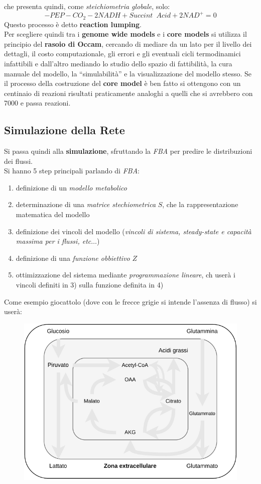 \documentclass[a4paper,12pt, oneside]{book}
\begin{document}
che presenta quindi, come \textit{steichiometria globale}, solo:
\[-PEP-CO_2-2NADH+Succint\,\,\,Acid+2NAD^{+}=0\]
Questo processo è detto \textbf{reaction lumping}.\\
Per scegliere quindi tra i \textbf{genome wide models} e i \textbf{core models}
si utilizza il principio del \textbf{rasoio di Occam}, cercando di mediare da un
lato per il livello dei dettagli, il costo computazionale, gli errori e gli
eventuali cicli termodinamici infattibili e dall'altro mediando lo studio dello
spazio di fattibilità, la cura manuale del modello, la ``simulabilità'' e la
visualizzazione del modello stesso. Se il processo della costruzione del
\textbf{core model} è ben fatto si ottengono con un centinaio di reazioni
risultati praticamente analoghi a quelli che si avrebbero con 7000 e passa
reazioni.
\subsection{Simulazione della Rete}
Si passa quindi alla \textbf{simulazione}, sfruttando la \textit{FBA} per
predire le distribuzioni dei flussi.\\
Si hanno 5 step principali parlando di \textit{FBA}:
\begin{enumerate}
  \item definizione di un \textit{modello metabolico}
  \item determinazione di una \textit{matrice stechiometrica} $S$, che la
  rappresentazione matematica del modello 
  \item definizione dei vincoli del modello (\textit{vincoli di sistema,
    steady-state e 
  capacità massima per i flussi, etc$\ldots$}) 
  \item definizione di una \textit{funzione obbiettivo} $Z$
  \item ottimizzazione del sistema mediante \textit{programmazione lineare}, ch
  userà i vincoli definiti in 3) sulla funzione definita in 4)
\end{enumerate}
Come esempio giocattolo (dove con le frecce grigie si intende l'assenza di
flusso) si userà: 
\begin{figure}[H]
  \centering
  \includegraphics[scale = 0.8]{img/toyclear.pdf}
\end{figure}
\end{document}
